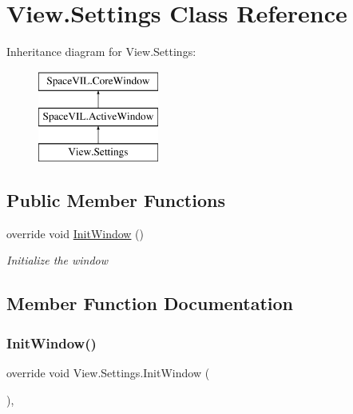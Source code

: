 \hypertarget{class_view_1_1_settings}{}\section{View.\+Settings Class Reference}
\label{class_view_1_1_settings}
Inheritance diagram for View.\+Settings\+:\begin{figure}[H]
\begin{center}
\leavevmode
\includegraphics[height=3.000000cm]{class_view_1_1_settings}
\end{center}
\end{figure}
\subsection*{Public Member Functions}
\begin{DoxyCompactItemize}
\item 
override void \mbox{\hyperlink{class_view_1_1_settings_a14740ebfdf1f004feb4b7248bf3e567a}{Init\+Window}} ()
\begin{DoxyCompactList}\small\item\em Initialize the window \end{DoxyCompactList}\end{DoxyCompactItemize}


\subsection{Member Function Documentation}
\mbox{\label{class_view_1_1_settings_a14740ebfdf1f004feb4b7248bf3e567a}} 
\subsubsection{\texorpdfstring{Init\+Window()}{InitWindow()}}
{\footnotesize\ttfamily override void View.\+Settings.\+Init\+Window (\begin{DoxyParamCaption}{ }\end{DoxyParamCaption})\hspace{0.3cm}{\ttfamily [inline]}, {\ttfamily [virtual]}}



